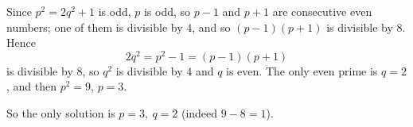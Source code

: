 Since $p^2=2q^2+1$ is odd, $p$ is odd, so $p-1$ and $p+1$ are consecutive even numbers; one of them is divisible by $4$, and so $(p-1)(p+1)$ is divisible by $8$. Hence
\[2q^2=p^2-1=(p-1)(p+1)\]
is divisible by $8$, so $q^2$ is divisible by $4$ and $q$ is even. The only even prime is $q=2$, and then $p^2=9$, $p=3$.

So the only solution is $\boxed{p=3,\ q=2}$ (indeed $9-8=1$).
